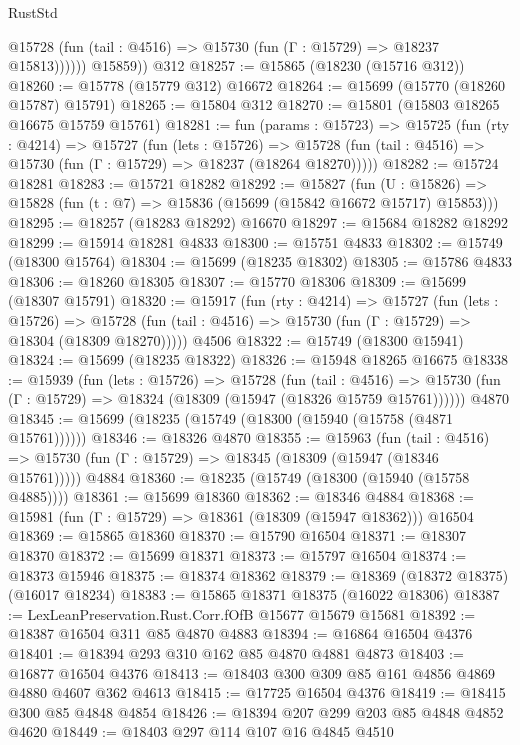 \begin{lexlean}{RustStd}
\begin{coremodule}
              @15728 (fun (tail : @4516) => @15730 (fun (Γ : @15729) => @18237 @15813))))))
        @15859))
    @312
@18257 := @15865 (@18230 (@15716 @312))
@18260 := @15778 (@15779 @312) @16672
@18264 := @15699 (@15770 (@18260 @15787) @15791)
@18265 := @15804 @312
@18270 := @15801 (@15803 @18265 @16675 @15759 @15761)
@18281 := fun (params : @15723) =>
  @15725
    (fun (rty : @4214) =>
    @15727
      (fun (lets : @15726) =>
      @15728 (fun (tail : @4516) => @15730 (fun (Γ : @15729) => @18237 (@18264 @18270)))))
@18282 := @15724 @18281
@18283 := @15721 @18282
@18292 := @15827
    (fun (U : @15826) => @15828 (fun (t : @7) => @15836 (@15699 (@15842 @16672 @15717) @15853)))
@18295 := @18257 (@18283 @18292) @16670
@18297 := @15684 @18282 @18292
@18299 := @15914 @18281 @4833
@18300 := @15751 @4833
@18302 := @15749 (@18300 @15764)
@18304 := @15699 (@18235 @18302)
@18305 := @15786 @4833
@18306 := @18260 @18305
@18307 := @15770 @18306
@18309 := @15699 (@18307 @15791)
@18320 := @15917
    (fun (rty : @4214) =>
    @15727
      (fun (lets : @15726) =>
      @15728 (fun (tail : @4516) => @15730 (fun (Γ : @15729) => @18304 (@18309 @18270)))))
    @4506
@18322 := @15749 (@18300 @15941)
@18324 := @15699 (@18235 @18322)
@18326 := @15948 @18265 @16675
@18338 := @15939
    (fun (lets : @15726) =>
    @15728
      (fun (tail : @4516) =>
      @15730 (fun (Γ : @15729) => @18324 (@18309 (@15947 (@18326 @15759 @15761))))))
    @4870
@18345 := @15699 (@18235 (@15749 (@18300 (@15940 (@15758 (@4871 @15761))))))
@18346 := @18326 @4870
@18355 := @15963
    (fun (tail : @4516) => @15730 (fun (Γ : @15729) => @18345 (@18309 (@15947 (@18346 @15761)))))
    @4884
@18360 := @18235 (@15749 (@18300 (@15940 (@15758 @4885))))
@18361 := @15699 @18360
@18362 := @18346 @4884
@18368 := @15981 (fun (Γ : @15729) => @18361 (@18309 (@15947 @18362))) @16504
@18369 := @15865 @18360
@18370 := @15790 @16504
@18371 := @18307 @18370
@18372 := @15699 @18371
@18373 := @15797 @16504
@18374 := @18373 @15946
@18375 := @18374 @18362
@18379 := @18369 (@18372 @18375) (@16017 @18234)
@18383 := @15865 @18371 @18375 (@16022 @18306)
@18387 := LexLeanPreservation.Rust.Corr.fOfB @15677 @15679 @15681
@18392 := @18387 @16504 @311 @85 @4870 @4883
@18394 := @16864 @16504 @4376
@18401 := @18394 @293 @310 @162 @85 @4870 @4881 @4873
@18403 := @16877 @16504 @4376
@18413 := @18403 @300 @309 @85 @161 @4856 @4869 @4880 @4607 @362 @4613
@18415 := @17725 @16504 @4376
@18419 := @18415 @300 @85 @4848 @4854
@18426 := @18394 @207 @299 @203 @85 @4848 @4852 @4620
@18449 := @18403
    @297
    @114
    @107
    @16
    @4845
    @4510

\end{coremodule}
\end{lexlean}
